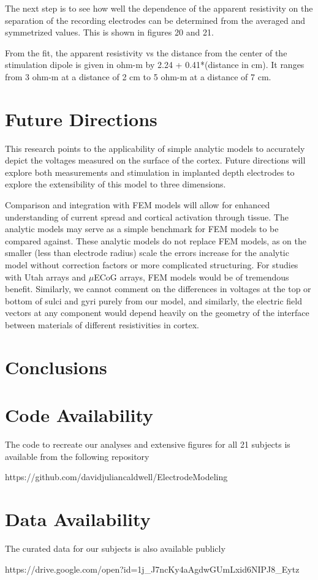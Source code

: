 The next step is to see how well the dependence of the apparent resistivity on the separation of the recording electrodes can be determined from the averaged and symmetrized values. 
This is shown in figures 20 and 21.

From the fit, the apparent resistivity vs the distance from the center of the stimulation dipole is given in ohm-m by 2.24 + 0.41*(distance in cm). 
It ranges from 3 ohm-m at a distance of 2 cm to 5 ohm-m at a distance of 7 cm.

\section{Future Directions}

This research points to the applicability of simple analytic models to accurately depict the voltages measured on the surface of the cortex. Future directions will explore both measurements and stimulation in implanted depth electrodes to explore the extensibility of this model to three dimensions. 

Comparison and integration with FEM models will allow for enhanced understanding of current spread and cortical activation through tissue. The analytic models may serve as a simple benchmark for FEM models to be compared against. These analytic models do not replace FEM models, as on the smaller (less than electrode radius) scale the errors increase for the analytic model without correction factors or more complicated structuring. For studies with Utah arrays and $\mu$ECoG arrays, FEM models would be of tremendous benefit. Similarly, we cannot comment on the differences in voltages at the top or bottom of sulci and gyri purely from our model, and similarly, the electric field vectors at any component would depend heavily on the geometry of the interface between materials of different resistivities in cortex. 

\section{Conclusions}

\section{Code Availability}
The code to recreate our analyses and extensive figures for all 21 subjects is available from the following repository 

https://github.com/davidjuliancaldwell/ElectrodeModeling

\section{Data Availability}
The curated data for our subjects is also available publicly 

https://drive.google.com/open?id=1j\_J7ncKy4aAgdwGUmLxid6NIPJ8\_Eytz


